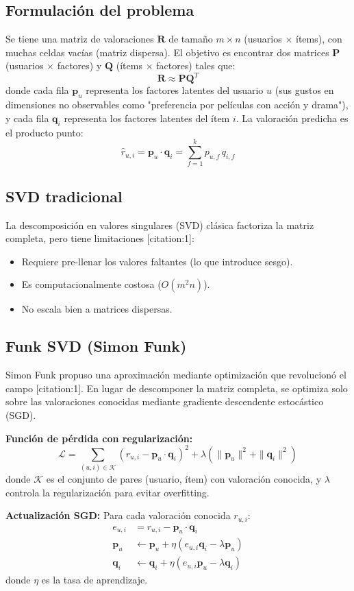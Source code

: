 \documentclass[12pt,a4paper,openany,oneside]{book}
\begin{document}
\subsection{Formulación del problema}
Se tiene una matriz de valoraciones \(\mathbf{R}\) de tamaño \(m \times n\) (usuarios \(\times\) ítems), con muchas celdas vacías (matriz dispersa). El objetivo es encontrar dos matrices \(\mathbf{P}\) (usuarios \(\times\) factores) y \(\mathbf{Q}\) (ítems \(\times\) factores) tales que:
\[
\mathbf{R} \approx \mathbf{P} \mathbf{Q}^T
\]
donde cada fila \(\mathbf{p}_u\) representa los factores latentes del usuario \(u\) (sus gustos en dimensiones no observables como "preferencia por películas con acción y drama"), y cada fila \(\mathbf{q}_i\) representa los factores latentes del ítem \(i\). La valoración predicha es el producto punto:
\[
\hat{r}_{u,i} = \mathbf{p}_u \cdot \mathbf{q}_i = \sum_{f=1}^k p_{u,f} \, q_{i,f}
\]

\subsection{SVD tradicional}
La descomposición en valores singulares (SVD) clásica factoriza la matriz completa, pero tiene limitaciones [citation:1]:
\begin{itemize}
    \item Requiere pre-llenar los valores faltantes (lo que introduce sesgo).
    \item Es computacionalmente costosa (\(O(m^2 n)\)).
    \item No escala bien a matrices dispersas.
\end{itemize}

\subsection{Funk SVD (Simon Funk)}
Simon Funk propuso una aproximación mediante optimización que revolucionó el campo [citation:1]. En lugar de descomponer la matriz completa, se optimiza solo sobre las valoraciones conocidas mediante gradiente descendente estocástico (SGD).

\textbf{Función de pérdida con regularización:}
\[
\mathcal{L} = \sum_{(u,i) \in \mathcal{K}} (r_{u,i} - \mathbf{p}_u \cdot \mathbf{q}_i)^2 + \lambda (\|\mathbf{p}_u\|^2 + \|\mathbf{q}_i\|^2)
\]
donde \(\mathcal{K}\) es el conjunto de pares (usuario, ítem) con valoración conocida, y \(\lambda\) controla la regularización para evitar overfitting.

\textbf{Actualización SGD:}
Para cada valoración conocida \(r_{u,i}\):
\begin{align*}
e_{u,i} &= r_{u,i} - \mathbf{p}_u \cdot \mathbf{q}_i \\
\mathbf{p}_u &\leftarrow \mathbf{p}_u + \eta (e_{u,i} \mathbf{q}_i - \lambda \mathbf{p}_u) \\
\mathbf{q}_i &\leftarrow \mathbf{q}_i + \eta (e_{u,i} \mathbf{p}_u - \lambda \mathbf{q}_i)
\end{align*}
donde \(\eta\) es la tasa de aprendizaje.
\end{document}
